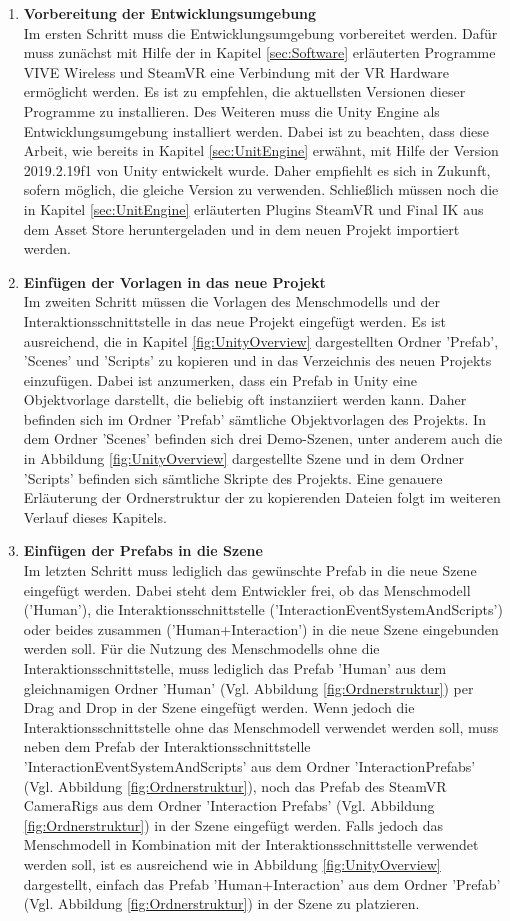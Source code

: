 \begin{enumerate}
	\item \textbf{Vorbereitung der Entwicklungsumgebung} \\
	Im ersten Schritt muss die Entwicklungsumgebung vorbereitet werden. Dafür muss zunächst mit Hilfe der in Kapitel \ref{sec:Software} erläuterten Programme VIVE Wireless und SteamVR eine Verbindung mit der VR Hardware ermöglicht werden. Es ist zu empfehlen, die aktuellsten Versionen dieser Programme zu installieren. Des Weiteren muss die Unity Engine als Entwicklungsumgebung installiert werden. Dabei ist zu beachten, dass diese Arbeit, wie bereits in Kapitel \ref{sec:UnitEngine} erwähnt, mit Hilfe der Version 2019.2.19f1 von Unity entwickelt wurde. Daher empfiehlt es sich in Zukunft, sofern möglich, die gleiche Version zu verwenden. Schließlich müssen noch die in Kapitel \ref{sec:UnitEngine} erläuterten Plugins SteamVR und Final IK aus dem Asset Store heruntergeladen und in dem neuen Projekt importiert werden.
	\item \textbf{Einfügen der Vorlagen in das neue Projekt} \\
	Im zweiten Schritt müssen die Vorlagen des Menschmodells und der Interaktionsschnittstelle in das neue Projekt eingefügt werden. Es ist ausreichend, die in Kapitel \ref{fig:UnityOverview} dargestellten Ordner 'Prefab', 'Scenes' und 'Scripts' zu kopieren und in das Verzeichnis des neuen Projekts einzufügen. Dabei ist anzumerken, dass ein Prefab in Unity eine Objektvorlage darstellt, die beliebig oft instanziiert werden kann. Daher befinden sich im Ordner 'Prefab' sämtliche Objektvorlagen des Projekts. In dem Ordner 'Scenes' befinden sich drei Demo-Szenen, unter anderem auch die in Abbildung \ref{fig:UnityOverview} dargestellte Szene und in dem Ordner 'Scripts' befinden sich sämtliche Skripte des Projekts. Eine genauere Erläuterung der Ordnerstruktur der zu kopierenden Dateien folgt im weiteren Verlauf dieses Kapitels.
	\item \textbf{Einfügen der Prefabs in die Szene} \\
	Im letzten Schritt muss lediglich das gewünschte Prefab in die neue Szene eingefügt werden. Dabei steht dem Entwickler frei, ob das Menschmodell ('Human'), die Interaktionsschnittstelle ('InteractionEventSystemAndScripts') oder beides zusammen ('Human+Interaction') in die neue Szene eingebunden werden soll. Für die Nutzung des Menschmodells ohne die Interaktionsschnittstelle, muss lediglich das Prefab 'Human' aus dem gleichnamigen Ordner 'Human' (Vgl. Abbildung \ref{fig:Ordnerstruktur}) per Drag and Drop in der Szene eingefügt werden. Wenn jedoch die Interaktionsschnittstelle ohne das Menschmodell verwendet werden soll, muss neben dem Prefab der Interaktionsschnittstelle 'InteractionEventSystemAndScripts' aus dem Ordner 'InteractionPrefabs' (Vgl. Abbildung \ref{fig:Ordnerstruktur}), noch das Prefab des SteamVR CameraRigs aus dem Ordner 'Interaction Prefabs' (Vgl. Abbildung \ref{fig:Ordnerstruktur}) in der Szene eingefügt werden. Falls jedoch das Menschmodell in Kombination mit der Interaktionsschnittstelle verwendet werden soll, ist es ausreichend wie in Abbildung \ref{fig:UnityOverview} dargestellt, einfach das Prefab 'Human+Interaction' aus dem Ordner 'Prefab' (Vgl. Abbildung \ref{fig:Ordnerstruktur}) in der Szene zu platzieren.

\end{enumerate}
